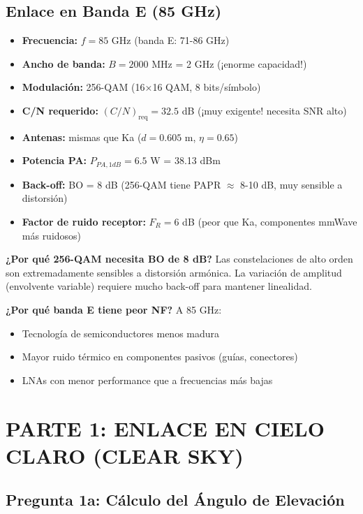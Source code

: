\documentclass[a4paper,10pt]{article}
\begin{document}
\begin{center}
{\begin{minipage}{0.9\textwidth}
\subsection*{Enlace en Banda E (85 GHz)}
\begin{itemize}[noitemsep]
    \item \textbf{Frecuencia:} $f = 85$ GHz (banda E: 71-86 GHz)
    \item \textbf{Ancho de banda:} $B = 2000$ MHz = 2 GHz (¡enorme capacidad!)
    \item \textbf{Modulación:} 256-QAM (16×16 QAM, 8 bits/símbolo)
    \item \textbf{C/N requerido:} $(C/N)_{\text{req}} = 32.5$ dB (¡muy exigente! necesita SNR alto)
    \item \textbf{Antenas:} mismas que Ka ($d = 0.605$ m, $\eta = 0.65$)
    \item \textbf{Potencia PA:} $P_{PA,1dB} = 6.5$ W = 38.13 dBm
    \item \textbf{Back-off:} BO = 8 dB (256-QAM tiene PAPR $\approx$ 8-10 dB, muy sensible a distorsión)
    \item \textbf{Factor de ruido receptor:} $F_R = 6$ dB (peor que Ka, componentes mmWave más ruidosos)
\end{itemize}

\textbf{¿Por qué 256-QAM necesita BO de 8 dB?} Las constelaciones de alto orden son extremadamente sensibles a distorsión armónica. La variación de amplitud (envolvente variable) requiere mucho back-off para mantener linealidad.

\textbf{¿Por qué banda E tiene peor NF?} A 85 GHz:
\begin{itemize}
    \item Tecnología de semiconductores menos madura
    \item Mayor ruido térmico en componentes pasivos (guías, conectores)
    \item LNAs con menor performance que a frecuencias más bajas
\end{itemize}
\end{minipage}
}
\end{center}

\newpage
\section{PARTE 1: ENLACE EN CIELO CLARO (CLEAR SKY)}

\subsection{Pregunta 1a: Cálculo del Ángulo de Elevación}
\end{document}
